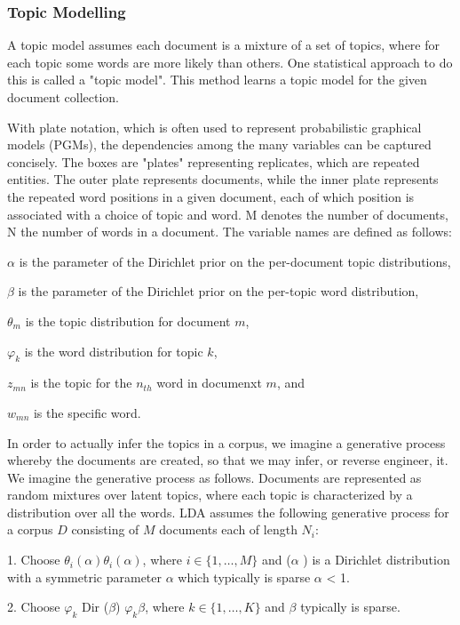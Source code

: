 \subsubsection{Topic Modelling}

A topic model assumes each document is a mixture of a set of topics, where for each topic some words are more likely than others. One statistical approach to do this is called a "topic model". This method learns a topic model for the given document collection.

With plate notation, which is often used to represent probabilistic graphical models (PGMs), the dependencies among the many variables can be captured concisely. The boxes are "plates" representing replicates, which are repeated entities. The outer plate represents documents, while the inner plate represents the repeated word positions in a given document, each of which position is associated with a choice of topic and word. M denotes the number of documents, N the number of words in a document. The variable names are defined as follows:

$\alpha$ is the parameter of the Dirichlet prior on the per-document topic distributions,

$\beta$ is the parameter of the Dirichlet prior on the per-topic word distribution,

$\theta_{m}$ is the topic distribution for document $m$,

$\varphi_{k}$ is the word distribution for topic $k$,

$z_{mn}$ is the topic for the $n_{th}$ word in documenxt $m$, and 

$w_{mn}$ is the specific word.

In order to actually infer the topics in a corpus, we imagine a generative process whereby the documents are created, so that we may infer, or reverse engineer, it. We imagine the generative process as follows. Documents are represented as random mixtures over latent topics, where each topic is characterized by a distribution over all the words. LDA assumes the following generative process for a corpus $D$ consisting of $M$ documents each of length $N_{i}$:

1. Choose $\theta _{i}(\alpha ) \theta _{i} (\alpha)$, where $i\in \{1,\dots ,M\}$ and ($\alpha$ ) is a Dirichlet distribution with a symmetric parameter $\alpha$ which typically is sparse $\alpha$ < 1.

2. Choose $\varphi _{k}$ {Dir} ($\beta$) $\varphi _{k} \beta$, where $k\in \{1,\dots ,K\}$ and $\beta$ typically is sparse.

